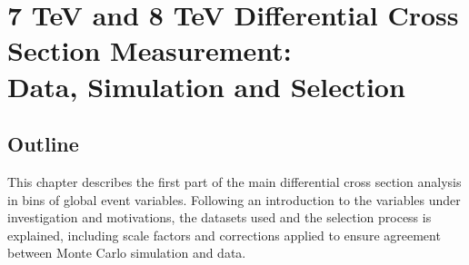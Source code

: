 \chapter{7 TeV and 8 TeV Differential Cross Section Measurement: \\ Data, Simulation and Selection}
\label{c:Differential_Cross_Section:data_simulation_and_selection}

\section{Outline}
\label{s:analysis1_outline}
This chapter describes the first part of the main \ttbar differential cross section analysis in bins of
global event variables. Following an introduction to the variables under investigation and motivations, the
datasets used and the selection process is explained, including scale factors and corrections applied to ensure agreement between Monte Carlo
simulation and data.

